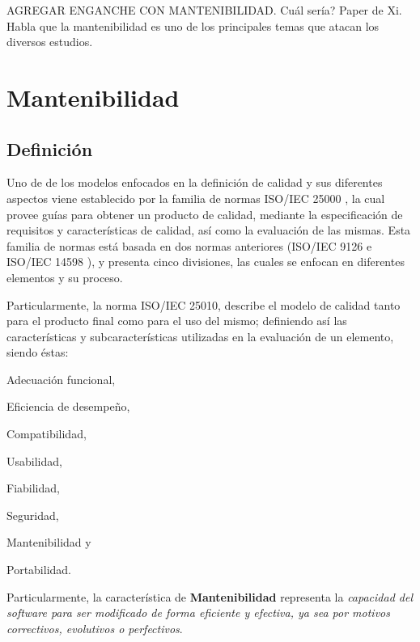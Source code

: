 AGREGAR ENGANCHE CON MANTENIBILIDAD.
Cuál sería?
Paper de Xi. Habla que la mantenibilidad es uno de los principales temas que atacan los diversos
estudios.

\section{Mantenibilidad}

\subsection{Definición}

Uno de de los modelos enfocados en la definición de calidad y sus diferentes aspectos
viene establecido por la familia de normas ISO/IEC 25000 \cite{ref}, 
la cual provee guías para obtener un producto de calidad, mediante la especificación 
de requisitos y características de calidad, así como la evaluación de las mismas.
Esta familia de normas está basada en dos normas anteriores (ISO/IEC 9126 \cite{ref}
e ISO/IEC 14598 \cite{ref}), y presenta cinco divisiones, las cuales se enfocan en diferentes
elementos y su proceso.

Particularmente, la norma ISO/IEC 25010, describe el modelo de calidad tanto para el producto
final como para el uso del mismo; definiendo así las características y subcaracterísticas
utilizadas en la evaluación de un elemento, siendo éstas:
\begin{inparaenum}[(1)]
    \item Adecuación funcional,
    \item Eficiencia de desempeño,
    \item Compatibilidad,
    \item Usabilidad,
    \item Fiabilidad,
    \item Seguridad,
    \item Mantenibilidad y
    \item Portabilidad.
\end{inparaenum}
Particularmente, la característica de \textbf{Mantenibilidad} representa la \textit{capacidad del
software para ser modificado de forma eficiente y efectiva, ya sea por motivos correctivos,
evolutivos o perfectivos}.

